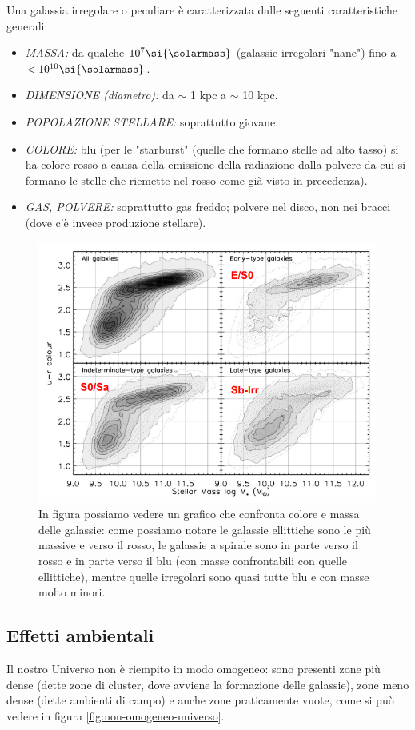 Una galassia irregolare o peculiare è caratterizzata dalle seguenti caratteristiche generali:

\begin{itemize}
	\item \emph{MASSA:} da qualche $10^7 \si{\solarmass}$ (galassie irregolari "nane") fino a $< 10^{10} \si{\solarmass}$.
	\item \emph{DIMENSIONE (diametro):} da $\sim$ 1 kpc a $\sim$ 10 kpc.
	\item \emph{POPOLAZIONE STELLARE:} soprattutto giovane.
	\item \emph{COLORE:} blu (per le "starburst" (quelle che formano stelle ad alto tasso) si ha colore rosso a causa della emissione della radiazione dalla polvere da cui si formano le stelle che riemette nel rosso come già visto in precedenza).
	\item \emph{GAS, POLVERE:} soprattutto gas freddo; polvere nel disco, non nei bracci (dove c'è invece produzione stellare).
\end{itemize}

\begin{figure}
	\centering
	\includegraphics[width = 0.6 \textwidth ]{immagini/galassie-colore-massa-stellare.png}
	\caption{In figura possiamo vedere un grafico che confronta colore e massa delle galassie: come possiamo notare le galassie ellittiche sono le più massive e verso il rosso, le galassie a spirale sono in parte verso il rosso e in parte verso il blu (con masse confrontabili con quelle ellittiche), mentre quelle irregolari sono quasi tutte blu e con masse molto minori.}
	\label{fig:galassie-colore-massastellare}
\end{figure}
\subsection{Effetti ambientali}
Il nostro Universo non è riempito in modo omogeneo: sono presenti zone più dense (dette zone di cluster, dove avviene la formazione delle galassie), zone meno dense (dette ambienti di campo) e anche zone praticamente vuote, come si può vedere in figura \ref{fig:non-omogeneo-universo}.

